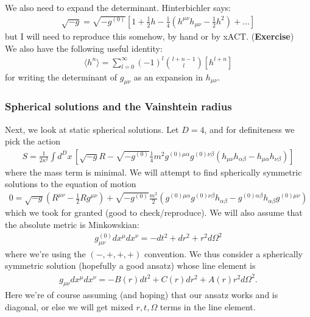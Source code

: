 \documentclass{book}
\theoremstyle{definition}
\newcommand{\f}[2]{\frac{#1}{#2}}
\newcommand{\lp}{\left(}
\newcommand{\rp}{\right)}
\newcommand{\lb}{\left[}
\newcommand{\rb}{\right]}
\begin{document}
We also need to expand the determinant. Hinterbichler says:
\begin{align}
\boxed{\sqrt{-g} = \sqrt{-g^{(0)}}\lb 1 + \f{1}{2}h - \f{1}{4}\lp h^{\mu\nu}h_{\mu\nu} - \f{1}{2}h^2 \rp + \dots \rb}
\end{align}
but I will need to reproduce this somehow, by hand or by xACT. (\textbf{Exercise})\\

We also have the following useful identity:
\begin{align}
\boxed{\langle h^n \rangle = \sum^\infty_{l=0}(-1)^l {{l+n-1}\choose{l}} [h^{l+n}]}
\end{align}
for writing the determinant of $g_{\mu\nu}$ as an expansion in $h_{\mu\nu}$. 






\newpage
\subsubsection{Spherical solutions and the Vainshtein radius}

Next, we look at static spherical solutions. Let $D=4$, and for definiteness we pick the action
\begin{align}
{S = \f{1}{2\kappa^2}\int d^Dx\, \lb \sqrt{-g}R - \sqrt{-g^{(0)}}\f{1}{4}m^2 g^{(0)\mu\alpha}g^{(0)\nu\beta}\lp h_{\mu\nu}h_{\alpha\beta} - h_{\mu\alpha}h_{\nu\beta} \rp \rb}
\end{align}
where the mass term is minimal. We will attempt to find spherically symmetric solutions to the equation of motion
\begin{align}
{0 = \sqrt{-g}\lp R^{\mu\nu} - \f{1}{2}Rg^{\mu\nu} \rp + \sqrt{-g^{(0)}}\f{m^2}{2}\lp g^{(0)\mu\alpha}g^{(0)\nu\beta}h_{\alpha\beta} - g^{(0)\alpha\beta}h_{\alpha\beta}g^{(0)\mu\nu}\rp}
\end{align} 
which we took for granted (good to check/reproduce). We will also assume that the absolute metric is Minkowskian:
\begin{align}
g^{(0)}_{\mu\nu}dx^\mu dx^\nu = -dt^2 + dr^2 + r^2 d\Omega^2
\end{align}
where we're using the $(-,+,+,+)$ convention. We thus consider a spherically symmetric solution (hopefully a good ansatz) whose line element is
\begin{align}
g_{\mu\nu}dx^\mu dx^\nu = -B(r)dt^2 + C(r)dr^2+ A(r)r^2d\Omega^2.
\end{align}
Here we're of course assuming (and hoping) that our ansatz works and is diagonal, or else we will get mixed $r,t,\Omega$ terms in the line element. \\
\end{document}
